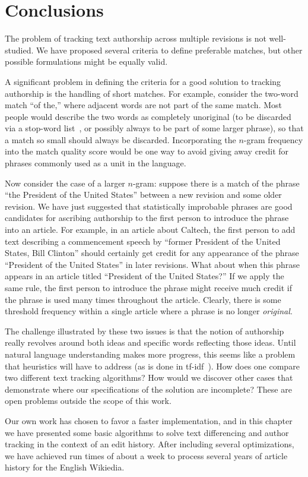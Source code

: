 \section{Conclusions}

The problem of tracking text authorship across multiple revisions
is not well-studied.
We have proposed several criteria to define preferable matches,
but other possible formulations
might be equally valid.

A significant problem in defining the criteria for a
good solution to tracking authorship is the handling of short matches.
For example, consider the two-word match ``of the,'' where adjacent
words are not part of the same match.
Most people would describe the two words as completely
unoriginal (to be discarded via a stop-word list~\cite{Kinzler2011},
or possibly always to be part of some larger phrase),
so that a match so small should always be discarded.
Incorporating the $n$-gram frequency into the match quality
score would be one way to avoid giving away credit for phrases
commonly used as a unit in the language.

Now consider the case of a larger $n$-gram: suppose there is a match
of the phrase ``the President of the United States'' between a new
revision and some older revision.
We have just suggested that statistically improbable phrases are
good candidates for ascribing authorship to the first person to
introduce the phrase into an article.
For example, in an article about Caltech, the first person to
add text describing a commencement speech by ``former President of
the United States, Bill Clinton'' should certainly get credit for
any appearance of the phrase ``President of the United States''
in later revisions.
What about when this phrase appears in an article titled
``President of the United States?''
If we apply the same rule, the first person to introduce the phrase
might receive much credit if the phrase is used many times throughout
the article.
Clearly, there is some threshold frequency within a single
article where a phrase is no longer \textit{original}.

The challenge illustrated by these two issues is that the notion
of authorship really revolves around both ideas and specific
words reflecting those ideas.
Until natural language understanding makes more progress, this seems
like a problem that heuristics will have to address
(\eg as is done in tf-idf~\cite{Jones1972}).
How does one compare two different text tracking algorithms?
How would we discover other cases that demonstrate where our
specifications of the solution are incomplete?
These are open problems outside the scope of this work.

Our own work has chosen to favor a faster implementation, and
in this chapter we have presented some basic algorithms to solve text
differencing and author tracking in the context of an edit history.
After including several optimizations, we have achieved run times
of about a week to process several years of article history for
the English Wikiedia.

